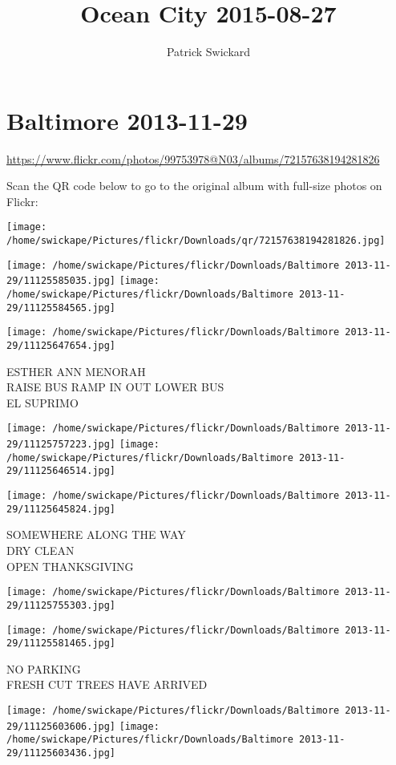\documentclass[10pt,letterpaper]{article}
\title{Ocean City 2015-08-27}
\author{Patrick Swickard}
\date{}
\begin{document}
\section*{Baltimore 2013-11-29}

\url{https://www.flickr.com/photos/99753978@N03/albums/72157638194281826}

Scan the QR code below to go to the original album with full-size photos on Flickr:

\texttt{[image: /home/swickape/Pictures/flickr/Downloads/qr/72157638194281826.jpg]}
\pagebreak

\texttt{[image: /home/swickape/Pictures/flickr/Downloads/Baltimore 2013-11-29/11125585035.jpg]}
\texttt{[image: /home/swickape/Pictures/flickr/Downloads/Baltimore 2013-11-29/11125584565.jpg]}

\vspace{0.25in}
\texttt{[image: /home/swickape/Pictures/flickr/Downloads/Baltimore 2013-11-29/11125647654.jpg]}

ESTHER ANN MENORAH\\
RAISE BUS RAMP IN OUT LOWER BUS\\
EL SUPRIMO
\pagebreak

\texttt{[image: /home/swickape/Pictures/flickr/Downloads/Baltimore 2013-11-29/11125757223.jpg]}
\texttt{[image: /home/swickape/Pictures/flickr/Downloads/Baltimore 2013-11-29/11125646514.jpg]}

\vspace{0.25in}
\texttt{[image: /home/swickape/Pictures/flickr/Downloads/Baltimore 2013-11-29/11125645824.jpg]}

SOMEWHERE ALONG THE WAY\\
DRY CLEAN\\
OPEN THANKSGIVING
\pagebreak

\texttt{[image: /home/swickape/Pictures/flickr/Downloads/Baltimore 2013-11-29/11125755303.jpg]}

\vspace{0.25in}
\texttt{[image: /home/swickape/Pictures/flickr/Downloads/Baltimore 2013-11-29/11125581465.jpg]}

NO PARKING\\
FRESH CUT TREES HAVE ARRIVED
\pagebreak

\texttt{[image: /home/swickape/Pictures/flickr/Downloads/Baltimore 2013-11-29/11125603606.jpg]}
\texttt{[image: /home/swickape/Pictures/flickr/Downloads/Baltimore 2013-11-29/11125603436.jpg]}
\end{document}
